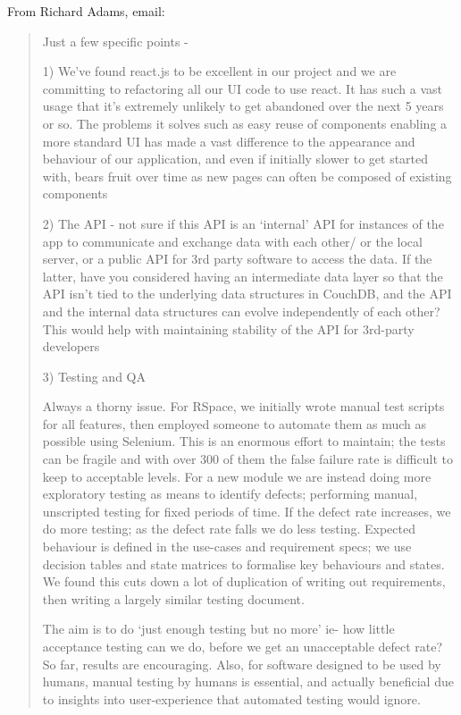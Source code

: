 \documentclass{faims3_report}
\begin{document}
From Richard Adams, email:
\begin{quote}
Just a few specific points -

1) We've found react.js to be excellent in our project and we are
committing to refactoring all our UI code to use react. It has such a
vast usage that it's extremely unlikely to get abandoned over the next 5
years or so. The problems it solves such as easy reuse of components
enabling a more standard UI has made a vast difference to the appearance
and behaviour of our application, and even if initially slower to get
started with, bears fruit over time as new pages can often be composed
of existing components

2) The API - not sure if this API is an `internal' API for instances of
the app to communicate and exchange data with each other/ or the local
server, or a public API for 3rd party software to access the data. If
the latter, have you considered having an intermediate data layer so
that the API isn't tied to the underlying data structures in CouchDB,
and the API and the internal data structures can evolve independently of
each other? This would help with maintaining stability of the API for
3rd-party developers

3) Testing and QA

 Always a thorny issue. For RSpace, we initially wrote manual test
  scripts for all features, then employed someone to automate them as
  much as possible using Selenium. This is an enormous effort to
  maintain; the tests can be fragile and with over 300 of them the false
  failure rate is difficult to keep to acceptable levels. For a new
  module we are instead doing more exploratory testing as means to
  identify defects; performing manual, unscripted testing for fixed
  periods of time. If the defect rate increases, we do more testing; as
  the defect rate falls we do less testing. Expected behaviour is
  defined in the use-cases and requirement specs; we use decision tables
  and state matrices to formalise key behaviours and states. We found
  this cuts down a lot of duplication of writing out requirements, then
  writing a largely similar testing document.
 
The aim is to do `just enough testing but no more' ie- how little
  acceptance testing can we do, before we get an unacceptable defect
  rate? So far, results are encouraging. Also, for software designed to
  be used by humans, manual testing by humans is essential, and actually
  beneficial due to insights into user-experience that automated testing
  would ignore.
 

\end{quote}
\end{document}
